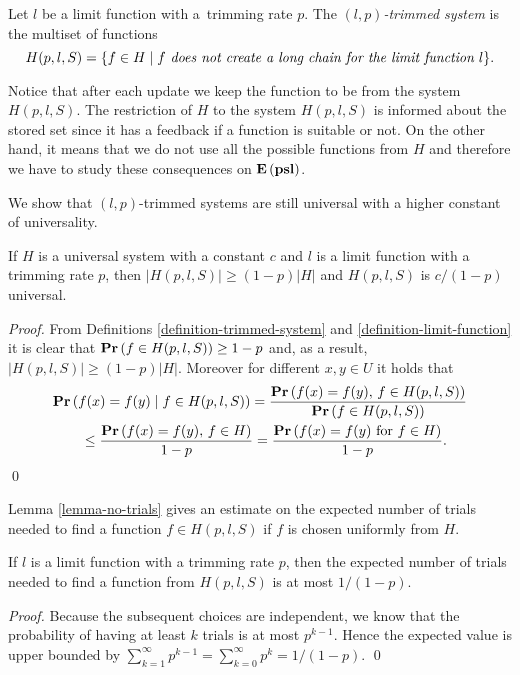 \begin{definition}
\label{definition-trimmed-system}
Let $l$ be a limit function with a~trimming rate $p$.
The \emph{$(l, p)$-trimmed system} is the multiset of functions \[ H(p, l, S) = \{ f \in H \mid f \textit{ does not create a long chain for the limit function $l$} \}. \]
\end{definition}

Notice that after each update we keep the function to be from the system $H(p, l, S)$.
The restriction of $H$ to the system $H(p, l, S)$ is informed about the stored set since it has a feedback if a function is suitable or not.
On the other hand, it means that we do not use all the possible functions from $H$ and therefore we have to study these consequences on $\mathbf{E}\left(\mathbf{psl}\right)$.

We show that $(l, p)$-trimmed systems are still universal with a higher constant of universality.
\begin{lemma}
\label{lemma-trimmed-system}
If $H$ is a universal system with a constant $c$ and $l$ is a limit function with a trimming rate $p$, then $|H(p, l, S)| \geq (1 - p)|H|$ and $H(p, l, S)$ is $c/(1 - p)$ universal.
\end{lemma}
\begin{proof}
From Definitions \ref{definition-trimmed-system} and \ref{definition-limit-function} it is clear that $\mathbf{Pr}\left(f \in H(p, l, S)\right) \geq 1 - p$ and, as a result, $|H(p, l, S)| \geq (1 - p)|H|$.
Moreover for different $x, y \in U$ it holds that
\[
\begin{split}
& \mathbf{Pr}\left(f(x) = f(y) \mid f \in H(p, l, S)\right) 
	= \frac{\mathbf{Pr}\left(f(x) = f(y),\, f \in H(p, l, S)\right)}{\mathbf{Pr}\left(f \in H(p, l, S)\right)} \\
	& \qquad \leq \frac{\mathbf{Pr}\left(f(x) = f(y),\, f \in H\right)}{1 - p} = \frac{\mathbf{Pr}\left(f(x) = f(y) \mbox{ for } f \in H\right)}{1 - p}. \\
\end{split}
\]
\qed
\end{proof}

Lemma \ref{lemma-no-trials} gives an estimate on the expected number of trials needed to find a function $f \in H(p, l, S)$ if $f$ is chosen uniformly from $H$.
\begin{lemma}
\label{lemma-no-trials}
If $l$ is a limit function with a trimming rate $p$, then the expected number of trials needed to find a function from $H(p, l, S)$ is at most ${1}/{(1 - p)}$.
\end{lemma}
\begin{proof}
Because the subsequent choices are independent, we know that the probability of having at least $k$ trials is at most $p^{k - 1}$. 
Hence the expected value is upper bounded by $\sum_{k = 1}^{\infty} p^{k - 1} = \sum_{k = 0}^{\infty} p^k = {1}/{(1 - p)}.$
\qed
\end{proof}

